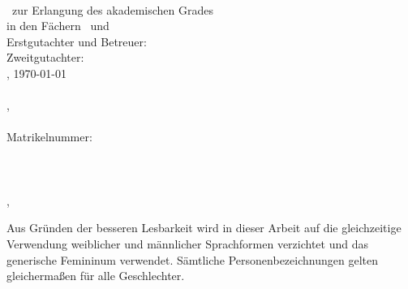 \hfill
\vfill
{
	\small
	\textbf{\thesisTitle} \\
	\thesisSubject\ zur Erlangung des akademischen Grades \textit{\thesisDegree} \\
	in den Fächern \thesisAuthorFirstSubject\ und \thesisAuthorSecondSubject \\
	Erstgutachter und Betreuer: \thesisFirstReviewer \\
	Zweitgutachter: \thesisSecondReviewer \\
	\thesisAuthorCity, \today \\[1.5em]	
	\textbf{\thesisName} \\
	\thesisAuthorStreet, \thesisAuthorPostalCode\ \thesisAuthorCity \\
	\texttt{\thesisAuthorMail} \\
	Matrikelnummer: \thesisAuthorId \\[1.5em]
	\textbf{\thesisUniversity} \\
	\thesisUniversityDepartment \\
	\thesisUniversityInstitute \\
	\thesisUniversityStreetAddress, \thesisUniversityPostalCode\ \thesisUniversityCity
	
	\vspace*{0.5cm}
	
	\scriptsize
	Aus Gründen der besseren Lesbarkeit wird in dieser Arbeit auf die gleichzeitige Verwendung weiblicher und männlicher Sprachformen verzichtet und das generische Femininum verwendet.
	Sämtliche Personenbezeichnungen gelten gleichermaßen für alle Geschlechter.
}
